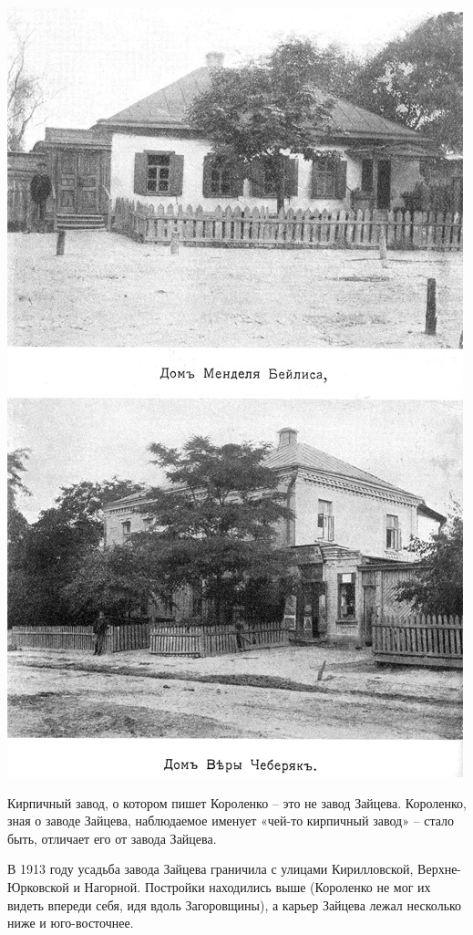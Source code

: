 \begin{center}
\includegraphics[width=\linewidth]{chast-kirvys/beylis/beylis-houses.jpg}
\end{center}

\newpage

Кирпичный завод, о котором пишет Короленко – это не завод Зайцева. Короленко, зная о заводе Зайцева, наблюдаемое именует «чей-то кирпичный завод» – стало быть, отличает его от завода Зайцева.

В 1913 году усадьба завода Зайцева граничила с улицами Кирилловской, Верхне-Юрковской и Нагорной. Постройки находились выше (Короленко не мог их видеть впереди себя, идя вдоль Загоровщины), а карьер Зайцева лежал несколько ниже и юго-восточнее.

